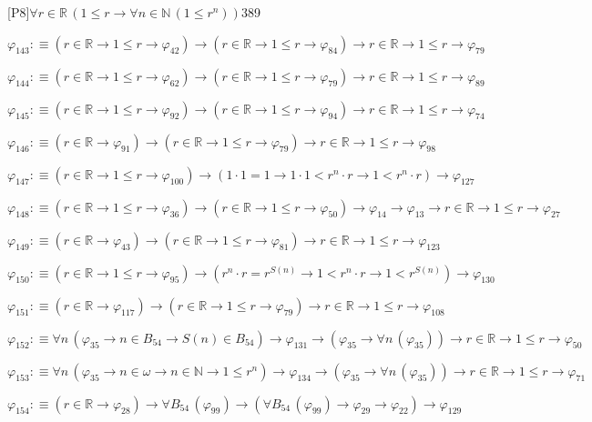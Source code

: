 \begin{fullproof}{[P8]}{$\forall r \in \mathbb{R}\,(1 \leq r \to \forall n \in \mathbb{N}\,(1 \leq {{r}^{n}}))$}{389}
\begin{abbrevlist}
\item $\varphi_{143} :\equiv (r \in \mathbb{R} \to 1 \leq r \to \varphi_{42}) \to (r \in \mathbb{R} \to 1 \leq r \to \varphi_{84}) \to r \in \mathbb{R} \to 1 \leq r \to \varphi_{79}$
\item $\varphi_{144} :\equiv (r \in \mathbb{R} \to 1 \leq r \to \varphi_{62}) \to (r \in \mathbb{R} \to 1 \leq r \to \varphi_{79}) \to r \in \mathbb{R} \to 1 \leq r \to \varphi_{89}$
\item $\varphi_{145} :\equiv (r \in \mathbb{R} \to 1 \leq r \to \varphi_{92}) \to (r \in \mathbb{R} \to 1 \leq r \to \varphi_{94}) \to r \in \mathbb{R} \to 1 \leq r \to \varphi_{74}$
\item $\varphi_{146} :\equiv (r \in \mathbb{R} \to \varphi_{91}) \to (r \in \mathbb{R} \to 1 \leq r \to \varphi_{79}) \to r \in \mathbb{R} \to 1 \leq r \to \varphi_{98}$
\item $\varphi_{147} :\equiv (r \in \mathbb{R} \to 1 \leq r \to \varphi_{100}) \to (1 \cdot 1 = 1 \to 1 \cdot 1 < {{r}^{n}} \cdot r \to 1 < {{r}^{n}} \cdot r) \to \varphi_{127}$
\item $\varphi_{148} :\equiv (r \in \mathbb{R} \to 1 \leq r \to \varphi_{36}) \to (r \in \mathbb{R} \to 1 \leq r \to \varphi_{50}) \to \varphi_{14} \to \varphi_{13} \to r \in \mathbb{R} \to 1 \leq r \to \varphi_{27}$
\item $\varphi_{149} :\equiv (r \in \mathbb{R} \to \varphi_{43}) \to (r \in \mathbb{R} \to 1 \leq r \to \varphi_{81}) \to r \in \mathbb{R} \to 1 \leq r \to \varphi_{123}$
\item $\varphi_{150} :\equiv (r \in \mathbb{R} \to 1 \leq r \to \varphi_{95}) \to ({{r}^{n}} \cdot r = {{r}^{S(n)}} \to 1 < {{r}^{n}} \cdot r \to 1 < {{r}^{S(n)}}) \to \varphi_{130}$
\item $\varphi_{151} :\equiv (r \in \mathbb{R} \to \varphi_{117}) \to (r \in \mathbb{R} \to 1 \leq r \to \varphi_{79}) \to r \in \mathbb{R} \to 1 \leq r \to \varphi_{108}$
\item $\varphi_{152} :\equiv \forall n\,(\varphi_{35} \to n \in B_{54} \to S(n) \in B_{54}) \to \varphi_{131} \to (\varphi_{35} \to \forall n\,(\varphi_{35})) \to r \in \mathbb{R} \to 1 \leq r \to \varphi_{50}$
\item $\varphi_{153} :\equiv \forall n\,(\varphi_{35} \to n \in \omega \to n \in \mathbb{N} \to 1 \leq {{r}^{n}}) \to \varphi_{134} \to (\varphi_{35} \to \forall n\,(\varphi_{35})) \to r \in \mathbb{R} \to 1 \leq r \to \varphi_{71}$
\item $\varphi_{154} :\equiv (r \in \mathbb{R} \to \varphi_{28}) \to \forall B_{54}\,(\varphi_{99}) \to (\forall B_{54}\,(\varphi_{99}) \to \varphi_{29} \to \varphi_{22}) \to \varphi_{129}$

\end{abbrevlist}
\end{fullproof}
